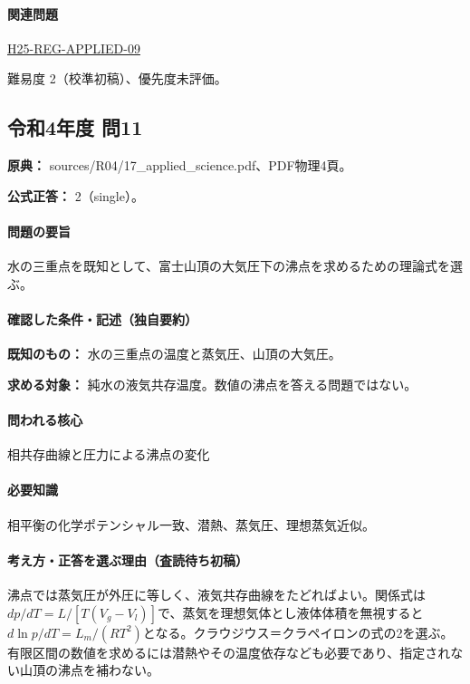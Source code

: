 \paragraph{関連問題} \hyperref[q:h25-reg-applied-09]{H25-REG-APPLIED-09}

\par 難易度 2（校準初稿）、優先度未評価。

\subsection{令和4年度 問11}
\label{q:r04-reg-applied-11}

\noindent\textbf{原典：} sources/R04/17\_applied\_science.pdf、PDF物理4頁。

\textbf{公式正答：} 2（single）。

\paragraph{問題の要旨} 水の三重点を既知として、富士山頂の大気圧下の沸点を求めるための理論式を選ぶ。

\paragraph{確認した条件・記述（独自要約）}\mbox{}\par

\noindent\textbf{既知のもの：} 水の三重点の温度と蒸気圧、山頂の大気圧。\par

\noindent\textbf{求める対象：} 純水の液気共存温度。数値の沸点を答える問題ではない。\par

\paragraph{問われる核心} 相共存曲線と圧力による沸点の変化

\paragraph{必要知識} 相平衡の化学ポテンシャル一致、潜熱、蒸気圧、理想蒸気近似。

\paragraph{考え方・正答を選ぶ理由（査読待ち初稿）} 沸点では蒸気圧が外圧に等しく、液気共存曲線をたどればよい。関係式は\(dp/dT=L/[T(V_g-V_l)]\)で、蒸気を理想気体とし液体体積を無視すると\(d\ln p/dT=L_m/(RT^2)\)となる。クラウジウス＝クラペイロンの式の2を選ぶ。有限区間の数値を求めるには潜熱やその温度依存なども必要であり、指定されない山頂の沸点を補わない。

